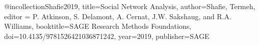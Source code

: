 
@incollection{Shafie2019,
title={Social Network Analysis},
author={Shafie, Termeh},
editor = {P. Atkinson, S. Delamont, A. Cernat, J.W. Sakshaug, and R.A. Williams},
booktitle={SAGE Research Methods Foundations},
doi={10.4135/9781526421036871242},
year={2019},
publisher={SAGE}
}